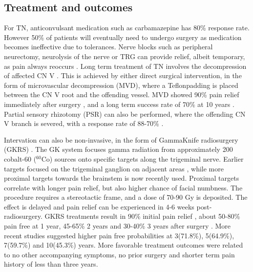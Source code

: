 \subsection{Treatment and outcomes}

For TN, anticonvulsant medication such as carbamazepine has 80\% response rate. However 50\% of patients will eventually need to undergo surgery as medication becomes ineffective due to tolerances. Nerve blocks such as peripheral neurectomy, neurolysis of the nerve or TRG can provide relief, albeit temporary, as pain always reoccurs \cite{Rappaport1994}. Long term treatment of TN involves the decompression of affected CN V \cite{Lovely1997}. This is achieved by either direct surgical intervention, in the form of microvascular decompression (MVD), where a Teflon\textcopyright padding is placed between the CN V root and the offending vessel. MVD showed 90\% pain relief immediately after surgery \cite{Zakrzewska2005}, and a long term success rate of 70\% at 10 years \cite{Barker1996}.
Partial sensory rhizotomy (PSR) can also be performed, where the offending CN V branch is severed, with a response rate of 88-70\% \cite{Young1993,Zakrzewska2005}. 

Intervation can also be non-invasive, in the form of GammaKnife radiosurgery (GKRS) \cite{Hodaie2012g}. The GK system focuses gamma radiation from approximately 200 cobalt-60 ($^{60}$Co) sources onto specific targets along the trigeminal nerve. Earlier targets focused on the trigeminal ganglion on adjacent areas \cite{Leksell1983}, while more proximal targets towards the brainstem is now recently used\cite{Daugherty2015}. Proximal targets correlate with longer pain relief, but also higher chance of facial numbness\cite{Xu2014}. The procedure requires a stereotactic frame, and a dose of 70-90 Gy is deposited. The effect is delayed and pain relief can be experienced in 4-6 weeks post-radiosurgery. GKRS treatments result in 90\% initial pain relief \cite{Regis2015,Kondziolka2010}, about 50-80\% pain free at 1 year, 45-65\% 2 years and 30-40\% 3 years after surgery \cite{Kondziolka2010,Sheehan2005}. More recent studies suggested higher pain free probabilities at 3(71.8\%), 5(64.9\%), 7(59.7\%) and 10(45.3\%) years\cite{Regis2015}. More favorable treatment outcomes were related to no other accompanying symptoms, no prior surgery and shorter term pain history of less than three years. 
